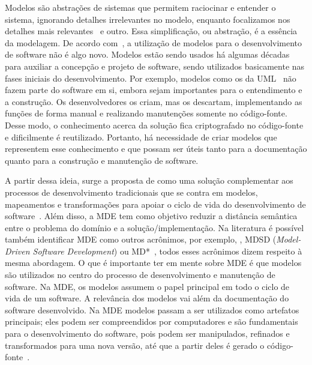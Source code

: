 Modelos são abstrações de sistemas que permitem raciocinar e entender o sistema, ignorando detalhes irrelevantes no modelo, enquanto focalizamos nos detalhes mais relevantes~\cite{Booch:2004:OAD:975416} e outro. Essa simplificação, ou abstração, é a essência da modelagem. De acordo com~\cite{Brown_2007, Bezivin02apreliminary}, a utilização de modelos para o desenvolvimento de software não é algo novo. Modelos estão sendo usados há algumas décadas para auxiliar a  concepção e projeto de software, sendo utilizados basicamente nas fases iniciais do desenvolvimento. Por exemplo, modelos como os da UML~\cite{UML:OMG} não fazem parte do software em si, embora sejam importantes para o entendimento e a construção. Os desenvolvedores os criam, mas os descartam, implementando as funções de forma manual e realizando manutenções somente no código-fonte. Desse modo, o conhecimento acerca da solução fica criptografado no código-fonte e dificilmente é reutilizado. Portanto, há necessidade de criar modelos que representem esse conhecimento e que possam ser úteis tanto para a documentação quanto para a construção e manutenção de software.


A partir dessa ideia, surge a proposta de  como uma solução complementar aos processos de desenvolvimento tradicionais que se contra em modelos, mapeamentos e transformações para apoiar o ciclo de vida do desenvolvimento de software~\cite{Lima_2007}. Além disso, a MDE tem como objetivo reduzir a distância semântica entre o problema do domínio e a solução/implementação. Na literatura é possível também identificar MDE como outros acrônimos, por exemplo, , MDSD (\textit{Model-Driven Software Development}) ou MD*~\cite{Kleppe:2003}, todos esses acrônimos dizem respeito à mesma abordagem. O que é importante ter em mente sobre MDE é que modelos são utilizados no centro do processo de desenvolvimento e manutenção de software. Na MDE, os modelos assumem o papel principal em todo o ciclo de vida de um software. A relevância dos modelos vai além da documentação do software desenvolvido. Na MDE modelos passam a ser utilizados como artefatos principais; eles podem ser compreendidos por computadores e são fundamentais para o desenvolvimento do software, pois podem ser manipulados, refinados e transformados para uma nova versão, até que a partir deles é gerado o código-fonte~\cite{Kleppe:2003, Brown_2007, Ben_Ammar}.

